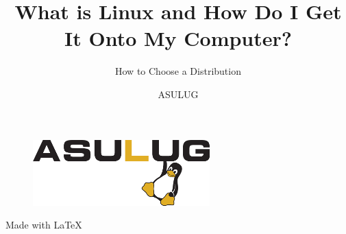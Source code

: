 \documentclass[11pt]{beamer}
\begin{document}
	\author{ASULUG}
	\title{What is Linux and How Do I Get It Onto My Computer?}
	\subtitle{How to Choose a Distribution}
	\begin{frame}[plain]
	\maketitle
	\begin{figure}
		\includegraphics[scale=2]{asulug-logo.png}
	\end{figure}
	Made with \LaTeX
\end{frame}
\end{document}

